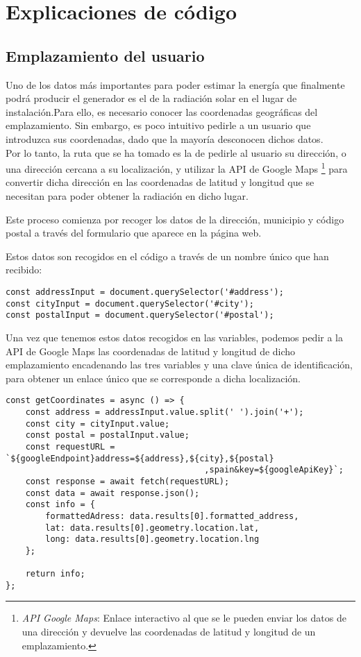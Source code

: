 \section{Explicaciones de código}

\subsection{Emplazamiento del usuario \label{section:get_address}}
Uno de los datos más importantes para poder estimar la energía que finalmente podrá producir el generador es el de la radiación solar en el lugar de instalación.Para ello, es necesario conocer las coordenadas geográficas del emplazamiento. Sin embargo, es poco intuitivo pedirle a un usuario que introduzca sus coordenadas, dado que la mayoría desconocen dichos datos.\\
Por lo tanto, la ruta que se ha tomado es la de pedirle al usuario su dirección, o una dirección cercana a su localización, y utilizar la API de Google Maps \footnote{\textit{API Google Maps}: Enlace interactivo al que se le pueden enviar los datos de una dirección y devuelve las coordenadas de latitud y longitud de un emplazamiento.  } para convertir dicha dirección en las coordenadas de latitud y longitud que se necesitan para poder obtener la radiación en dicho lugar.

Este proceso comienza por recoger los datos de la dirección, municipio y código postal a través del formulario que aparece en la página web.

Estos datos son recogidos en el código a través de un nombre único que han recibido:\\
\begin{lstlisting}[style=ES6, caption={Variables correspondientes a los tres campos}]
const addressInput = document.querySelector('#address');
const cityInput = document.querySelector('#city');
const postalInput = document.querySelector('#postal');
\end{lstlisting}

Una vez que tenemos estos datos recogidos en las variables, podemos pedir a la API de Google Maps las coordenadas de latitud y longitud de dicho emplazamiento encadenando las tres variables y una clave única de identificación,  para obtener un enlace único que se corresponde a dicha localización.
\begin{lstlisting}[style=ES6, label={lst:getCoordinates}, caption={Función encargada de solicitar los datos a la API}]
const getCoordinates = async () => {
	const address = addressInput.value.split(' ').join('+');
	const city = cityInput.value;
	const postal = postalInput.value;
	const requestURL = `${googleEndpoint}address=${address},${city},${postal}
										,spain&key=${googleApiKey}`;
	const response = await fetch(requestURL);
	const data = await response.json();
	const info = {
		formattedAdress: data.results[0].formatted_address,
		lat: data.results[0].geometry.location.lat,
		long: data.results[0].geometry.location.lng
	};

	return info;
};
\end{lstlisting}

